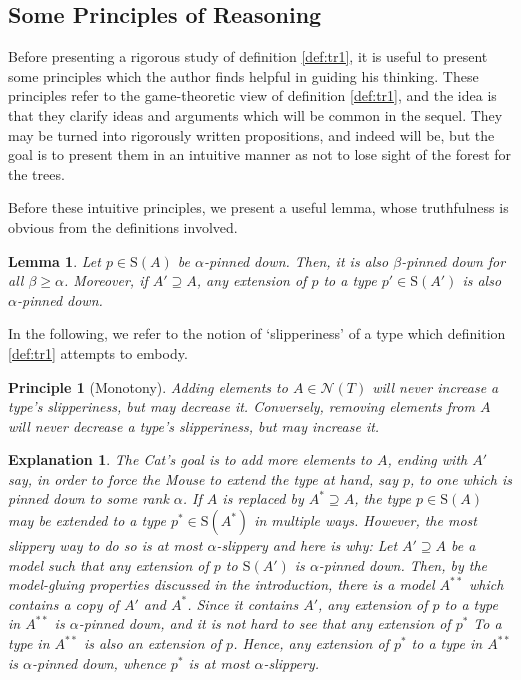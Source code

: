 \documentclass{article}
\newtheorem{lemma}[theorem]{Lemma}
\newtheorem{principle}{Principle}
\theoremstyle{nonumberplain}
\newtheorem{explanation}{Explanation}
\newcommand{\calN}{\mathcal{N}}
\newcommand{\Stone}{\mathrm{S}}
\begin{document}
\subsection{Some Principles of Reasoning}

Before presenting a rigorous study of definition \ref{def:tr1}, it is useful to present some principles which the author finds helpful in guiding his thinking. These principles refer to the game-theoretic view of definition \ref{def:tr1}, and the idea is that they clarify ideas and arguments which will be common in the sequel. They may be turned into rigorously written propositions, and indeed will be, but the goal is to present them in an intuitive manner as not to lose sight of the forest for the trees.

Before these intuitive principles, we present a useful lemma, whose truthfulness is obvious from the definitions involved.

\begin{lemma}\label{lemma:pdmono}
Let $p \in \Stone(A)$ be $\alpha$-pinned down. Then, it is also $\beta$-pinned down for all $\beta \geq \alpha$. Moreover, if $A' \supseteq A$, any extension of $p$ to a type $p' \in \Stone(A')$ is also $\alpha$-pinned down.
\end{lemma}

In the following, we refer to the notion of `slipperiness' of a type which definition \ref{def:tr1} attempts to embody.

\begin{principle}[Monotony]\label{principle:mono}
Adding elements to $A \in \calN(T)$ will never increase a type's slipperiness, but may decrease it. Conversely, removing elements from $A$ will never decrease a type's slipperiness, but may increase it. 
\end{principle}

\begin{explanation}
The Cat's goal is to add more elements to $A$, ending with $A'$ say, in order to force the Mouse to extend the type at hand, say $p$, to one which is pinned down to some rank $\alpha$. If $A$ is replaced by $A^* \supseteq A$, the type $p \in \Stone(A)$ may be extended to a type $p^* \in \Stone(A^*)$ in multiple ways. However, the most slippery way to do so is at most $\alpha$-slippery and here is why: Let $A' \supseteq A$ be a model such that any extension of $p$ to $\Stone(A')$ is $\alpha$-pinned down. Then, by the model-gluing properties discussed in the introduction, there is a model $A^{**}$ which contains a copy of $A'$ and $A^*$. Since it contains $A'$, any extension of $p$ to a type in $A^{**}$ is $\alpha$-pinned down, and it is not hard to see that any extension of $p^*$ To a type in $A^{**}$ is also an extension of $p$. Hence, any extension of $p^*$ to a type in $A^{**}$ is $\alpha$-pinned down, whence $p^*$ is at most $\alpha$-slippery.
\end{explanation}
\end{document}
